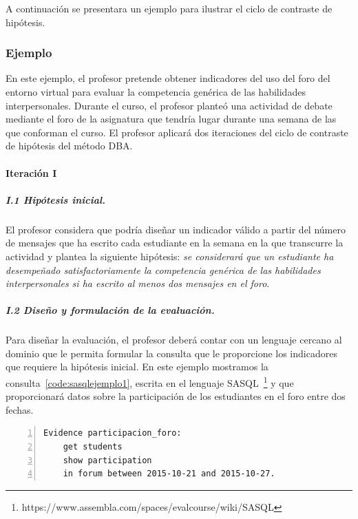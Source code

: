 A continuación se presentara un ejemplo para ilustrar el ciclo de contraste de hipótesis. 

\subsubsection*{Ejemplo}

En este ejemplo, el profesor pretende obtener indicadores del uso del foro del entorno virtual para evaluar la competencia genérica de las habilidades interpersonales. Durante el curso, el profesor planteó una actividad de debate mediante el foro de la asignatura que tendría lugar durante una semana de las que conforman el curso. El profesor aplicará dos iteraciones del ciclo de contraste de hipótesis del método DBA.

\paragraph*{Iteración I}

\subparagraph*{I.1 Hipótesis inicial.}

El profesor considera que podría diseñar un indicador válido a partir del número de mensajes que ha escrito cada estudiante en la semana en la que transcurre la actividad y plantea la siguiente hipótesis: \emph{se considerará que un estudiante ha desempeñado satisfactoriamente la competencia genérica de las habilidades interpersonales si ha escrito al menos dos mensajes en el foro}.

\subparagraph*{I.2 Diseño y formulación de la evaluación.}

Para diseñar la evaluación, el profesor deberá contar con un lenguaje cercano al dominio que le permita formular la consulta que le proporcione los indicadores que requiere la hipótesis inicial. En este ejemplo mostramos la consulta~\ref{code:sasqlejemplo1}, escrita en el lenguaje SASQL~\footnote{https://www.assembla.com/spaces/evalcourse/wiki/SASQL} y que proporcionará datos sobre la participación de los estudiantes en el foro entre dos fechas.

\begin{lstlisting}[caption=Participación en el foro en un periodo concreto de tiempo ,label=code:sasqlejemplo1,numbers=left, captionpos=b, morekeywords={Evidence,get, students, show, milestones, participation, access, in, assignment, forum, campus, workshop, interaction, between, and}]
Evidence participacion_foro: 
	get students
	show participation
	in forum between 2015-10-21 and 2015-10-27.
\end{lstlisting}


